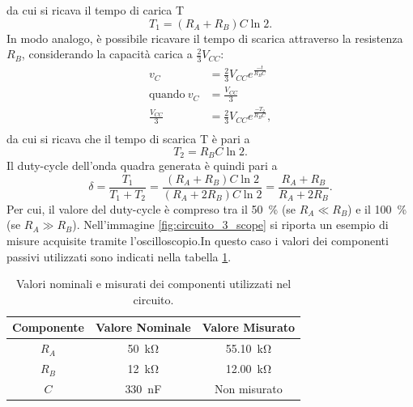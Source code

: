 da cui si ricava il tempo di carica T
\begin{equation}
	T_{1}=(R_A+R_B)C\ln{2}.
\end{equation}
In modo analogo, è possibile ricavare il tempo di scarica attraverso la resistenza $R_B$, considerando la capacità carica a $\frac{2}{3}V_{CC}$:
\begin{equation}
	\begin{split}
		v_C&=\frac{2}{3}V_{CC}e^{\frac{-t}{R_BC}} \\
		\text{quando} \ v_C&=\frac{V_{CC}}{3} \\
		\frac{V_{CC}}{3}&=\frac{2}{3}V_{CC}e^{\frac{-T_2}{R_BC}}, \\
	\end{split}
\end{equation}
da cui si ricava che il tempo di scarica T è pari a
\begin{equation}
	T_2=R_B C \ln{2}.
\end{equation}
Il duty-cycle dell'onda quadra generata è quindi pari a 
\begin{equation}
	\delta=\frac{T_1}{T_1+T_2}=\frac{\left(R_A+R_B\right)C\ln{2}}{\left(R_A+2R_B\right)C\ln{2}}=\frac{R_A+R_B}{R_A+2R_B}.
	\label{eq:3_1}
\end{equation}
Per cui, il valore del duty-cycle è compreso tra il \SI{50}{\percent} (se $R_A\ll R_B$) e il \SI{100}{\percent} (se $R_A \gg R_B$). 
\noindent
Nell'immagine \ref{fig:circuito_3_scope} si riporta un esempio di misure acquisite tramite l'oscilloscopio.In questo caso i valori dei componenti passivi utilizzati sono indicati nella tabella \ref{tab:valori_componenti_4}.
\def\arraystretch{1.3}
\begin{table}[h!]
	\centering
	\begin{tabular}{|c|c|c|}
		\hline
		Componente	& Valore Nominale & Valore Misurato \\ \hline
		$R_A$ &\SI{50}{\kilo\ohm} & \SI{55.10}{\kilo\ohm} \\ \hline
		$R_B$ &\SI{12}{\kilo\ohm} & \SI{12.00}{\kilo\ohm} \\ \hline
		$C$ & \SI{330}{\nano\farad} & Non misurato \\ \hline
	\end{tabular}
	\caption{Valori nominali e misurati dei componenti utilizzati nel circuito.}
	\label{tab:valori_componenti_4}
\end{table}
